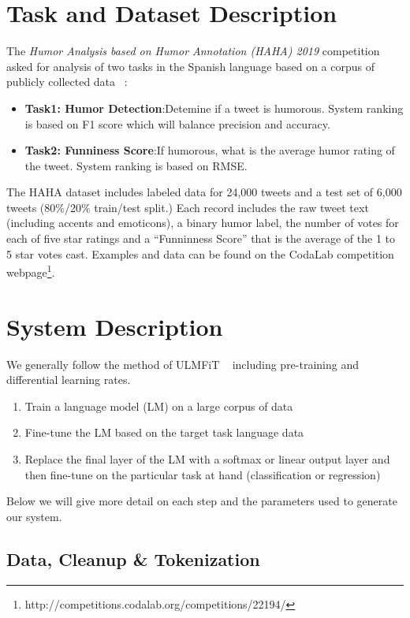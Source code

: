 \documentclass[smallextended]{svjour3}       %
\begin{document}
\section{Task and Dataset Description}
\label{sec:task}
The \textit{Humor Analysis based on Humor Annotation (HAHA) 2019}\cite{overview_haha2019} competition asked for analysis of two tasks in the Spanish language based on a corpus of publicly collected data ~\cite{castro2018crowd}:
\begin{itemize}
\item \textbf{Task1: Humor Detection}:Detemine if a tweet is humorous. System ranking is based on F1 score which will balance precision and accuracy.
\item \textbf{Task2: Funniness Score}:If humorous, what is the average humor rating of the tweet. System ranking is based on RMSE.
\end{itemize}
The HAHA dataset includes labeled data for 24,000 tweets and a test set of 6,000 tweets (80\%/20\% train/test split.)  Each record includes the raw tweet text (including accents and emoticons), a binary humor label, the number of votes for each of five star ratings and a ``Funninness Score'' that is the average of the 1 to 5 star votes cast.  Examples and data can be found on the CodaLab competition webpage\footnote{http://competitions.codalab.org/competitions/22194/}.

\section{System Description}
\label{sec:system}
We generally follow the method of ULMFiT ~\cite{HowardRuder:DBLP:journals/corr/abs-1801-06146} including pre-training and differential learning rates. 
\begin{enumerate}
	\item Train a language model (LM) on a large corpus of data
	\item Fine-tune the LM based on the target task language data
	\item Replace the final layer of the LM with a softmax or linear output layer and then fine-tune on the particular task at hand (classification or regression)
\end{enumerate}
Below we will give more detail on each step and the parameters used to generate our system.
\subsection{Data, Cleanup \& Tokenization}
\label{sec:datacleaning}
\end{document}
